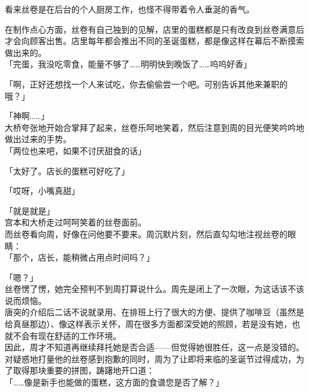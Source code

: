 看来丝卷是在后台的个人厨房工作，也怪不得带着令人垂涎的香气。

在制作点心方面，丝卷有自己独到的见解，店里的蛋糕都是只有改良到丝卷满意后才会向顾客出售。店里每年都会推出不同的圣诞蛋糕，都是像这样在幕后不断摸索做出来的。\\

「完蛋，我没吃零食，能量不够了……明明快到晚饭了……呜呜好香」

「啊，正好还想找一个人来试吃，你去偷偷尝一个吧。可别告诉其他来兼职的哦？」

「神啊……」\\

大桥夸张地开始合掌拜了起来，丝卷乐呵地笑着，然后注意到周的目光便笑吟吟地做出过来的手势。\\

「两位也来吧，如果不讨厌甜食的话」

「太好了。店长的蛋糕可好吃了」

「哎呀，小嘴真甜」

「就是就是」\\

宫本和大桥走过呵呵笑着的丝卷面前。\\

而丝卷看向周，好像在问他要不要来。周沉默片刻，然后直勾勾地注视丝卷的眼睛：\\

「那个，店长，能稍微占用点时间吗？」

「嗯？」\\

丝卷愣了愣，她完全预判不到周打算说什么。周先是闭上了一次眼，为这话该不该说而烦恼。\\

唐突的介绍后二话不说就录用、在排班上行了很大的方便、提供了咖啡豆（虽然是给真昼那边）、像这样表示关怀，周在很多方面都深受她的照顾，若是没有她，也就不会有现在舒适的工作环境。\\

因此，周才不知道再继续拜托她是否合适——但觉得她很胜任，这一点是没错的。\\

对疑惑地打量他的丝卷感到抱歉的同时，周为了让即将来临的圣诞节过得成功，为了取得那块重要的拼图，踌躇地开口道：\\

「……像是新手也能做的蛋糕，这方面的食谱您是否了解？」
